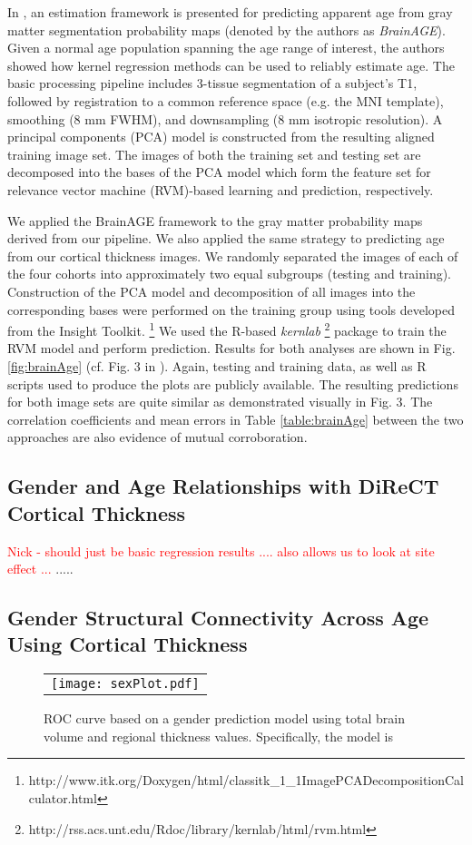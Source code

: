 In \cite{franke2010}, an estimation framework is presented for predicting 
apparent age from gray matter segmentation probability maps (denoted by the authors as {\it BrainAGE}).  
Given a normal age population spanning the age range of interest, the authors showed
how kernel regression methods can be used to reliably estimate age.  The basic processing pipeline includes 3-tissue segmentation
of a subject's T1, followed by registration to a common reference space (e.g.
the MNI template), smoothing (8 mm FWHM), and downsampling (8 mm 
isotropic resolution).  A principal components (PCA) model is constructed 
from the resulting aligned training image set.  The images of both the training set and 
testing set are decomposed into the bases of the PCA model which form the feature
set for relevance vector machine (RVM)-based learning and prediction, respectively. 

We applied the BrainAGE framework to the gray matter probability maps derived
from our pipeline.  We also applied the same strategy to predicting age from 
our cortical thickness images.  We randomly separated the images of each of the 
four cohorts into approximately two equal subgroups (testing and training).
Construction of the PCA model and decomposition of all images into the corresponding 
bases were performed on the training group using tools developed from the Insight Toolkit.%
\footnote{
http://www.itk.org/Doxygen/html/classitk\_1\_1ImagePCADecompositionCalculator.html  
}
We used the R-based {\it kernlab}%
\footnote{
http://rss.acs.unt.edu/Rdoc/library/kernlab/html/rvm.html
} 
package to train the RVM model and perform prediction.  Results for both
analyses  are shown in Fig. \ref{fig:brainAge} (cf. Fig. 3 in \cite{franke2010}).
Again, testing and training data, as well as 
R scripts used to produce the 
plots are publicly available.  
The resulting predictions for both image sets are quite similar as demonstrated 
visually in Fig. 3.  The correlation coefficients and mean errors in Table 
\ref{table:brainAge} between the
two approaches are also evidence of mutual corroboration.

\subsection{Gender and Age Relationships with DiReCT Cortical Thickness}

\textcolor{red}{ Nick - should just be basic regression results
  .... also allows us to look at site effect ... }
.....

\subsection{Gender Structural Connectivity Across Age Using Cortical Thickness}
\begin{figure}
  \centering
  \begin{tabular}{c}
  \texttt{[image: sexPlot.pdf]} 
  \end{tabular}
  \caption{ROC curve based on a gender prediction model using total brain volume and regional thickness values.  Specifically, the model is
  }
  \label{fig:sexROC}
\end{figure}

